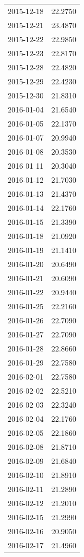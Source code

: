 \begin{tabular}{lr}
2015-12-18 &     22.2750 \\
2015-12-21 &     23.4870 \\
2015-12-22 &     22.9850 \\
2015-12-23 &     22.8170 \\
2015-12-28 &     22.4820 \\
2015-12-29 &     22.4230 \\
2015-12-30 &     21.8310 \\
2016-01-04 &     21.6540 \\
2016-01-05 &     22.1370 \\
2016-01-07 &     20.9940 \\
2016-01-08 &     20.3530 \\
2016-01-11 &     20.3040 \\
2016-01-12 &     21.7030 \\
2016-01-13 &     21.4370 \\
2016-01-14 &     22.1760 \\
2016-01-15 &     21.3390 \\
2016-01-18 &     21.0920 \\
2016-01-19 &     21.1410 \\
2016-01-20 &     20.6490 \\
2016-01-21 &     20.6090 \\
2016-01-22 &     20.9440 \\
2016-01-25 &     22.2160 \\
2016-01-26 &     22.7090 \\
2016-01-27 &     22.7090 \\
2016-01-28 &     22.8660 \\
2016-01-29 &     22.7580 \\
2016-02-01 &     22.7580 \\
2016-02-02 &     22.5210 \\
2016-02-03 &     22.3240 \\
2016-02-04 &     22.1760 \\
2016-02-05 &     22.1860 \\
2016-02-08 &     21.8710 \\
2016-02-09 &     21.6840 \\
2016-02-10 &     21.8910 \\
2016-02-11 &     21.2890 \\
2016-02-12 &     21.2010 \\
2016-02-15 &     21.2990 \\
2016-02-16 &     20.9050 \\
2016-02-17 &     21.4960 \\

\end{tabular}
